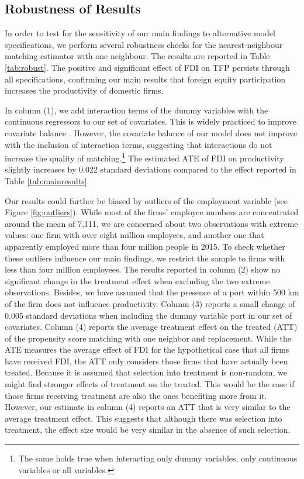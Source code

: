 \documentclass[a4paper,11pt]{scrartcl}
\begin{document}
\subsection{Robustness of Results}

In order to test for the sensitivity of our main findings to alternative model specifications, we perform several robustness checks for the nearest-neighbour matching estimator with one neighbour. The results are reported in Table \ref{tab:robust}. The positive and significant effect of FDI on TFP persists through all specifications, confirming our main results that foreign equity participation increases the productivity of domestic firms. 

In column (1), we add interaction terms of the dummy variables with the continuous regressors to our set of covariates. This is widely practiced to improve covariate balance \citep{Caliendo08}.
However, the covariate balance of our model does not improve with the inclusion of interaction terms, suggesting that interactions do not increase the quality of matching.\footnote{The same holds true when interacting only dummy variables, only continuous variables or all variables.} The estimated ATE of FDI on productivity slightly increases by 0.022 standard deviations compared to the effect reported in Table \ref{tab:mainresults}. 

Our results could further be biased by outliers of the employment variable (see Figure \ref{fig:outliers}). While most of the firms' employee numbers are concentrated around the mean of 7,111, we are concerned about two observations with extreme values: one firm with over eight million employees, and another one that apparently employed more than four million people in 2015. To check whether these outliers influence our main findings, we restrict the sample to firms with less than four million employees. The results reported in column (2) show no significant change in the treatment effect when excluding the two extreme observations. %
Besides, we have assumed that the presence of a port within 500 km of the firm does not influence productivity. Column (3) reports a small change of 0.005 standard deviations when including the dummy variable port in our set of covariates. 
Column (4) reports the average treatment effect on the treated (ATT) of the propensity score matching with one neighbor and replacement. While the ATE measures the average effect of FDI for the hypothetical case that all firms have received FDI, the ATT only considers those firms that have actually been treated. Because it is assumed that selection into treatment is non-random, we might find stronger effects of treatment on the treated. This would be the case if those firms receiving treatment are also the ones benefiting more from it. However, our estimate in column (4) reports an ATT that is very similar to the average treatment effect. This suggests that although there was selection into treatment, the effect size would be very similar in the absence of such selection. 
\end{document}
